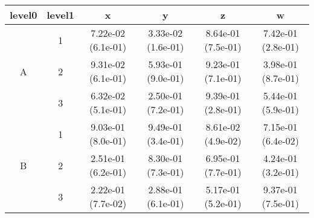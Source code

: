 \begin{tabular}{cccccc}
\toprule
level0 & level1&x&y&z&w\tabularnewline
\midrule
\multirow{3}{*}{A}&1& 7.22e-02 (6.1e-01)& 3.33e-02 (1.6e-01)& 8.64e-01 (7.5e-01)& 7.42e-01 (2.8e-01)\tabularnewline
&2& 9.31e-02 (6.1e-01)& 5.93e-01 (9.0e-01)& 9.23e-01 (7.1e-01)& 3.98e-01 (8.7e-01)\tabularnewline
&3& 6.32e-02 (5.1e-01)& 2.50e-01 (7.2e-01)& 9.39e-01 (2.8e-01)& 5.44e-01 (5.9e-01)\tabularnewline
\midrule
\multirow{3}{*}{B}&1& 9.03e-01 (8.0e-01)& 9.49e-01 (3.4e-01)& 8.61e-02 (4.9e-02)& 7.15e-01 (6.4e-02)\tabularnewline
&2& 2.51e-01 (6.2e-01)& 8.30e-01 (7.3e-01)& 6.95e-01 (7.7e-01)& 4.24e-01 (3.2e-01)\tabularnewline
&3& 2.22e-01 (7.7e-02)& 2.88e-01 (6.1e-01)& 5.17e-01 (5.2e-01)& 9.37e-01 (7.5e-01)\tabularnewline
\bottomrule
\end{tabular}
